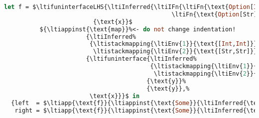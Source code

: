 {\begin{lstlisting}[language=ml,mathescape=true]
let f = $\ltifuninterfaceLHS{\ltiInferred{\ltiIFn{\ltiFn{\text{Option[Int]}}{\text{Option[Int]}}%
                                               \ltiFn{\text{Option[Str]}}{\text{Option[Str]}}}}}%
                         {\text{x}}$
          ${\ltiappinst{\text{map}}%<- do not change indentation!
                       {\ltiInferred%
                        {\ltistackmapping{\ltiEnv{1}}{\text{[Int,Int]}},%
                         \ltistackmapping{\ltiEnv{2}}{\text{[Str,Str]}}}}%
                       {\ltifuninterface{\ltiInferred%
                                         {\ltistackmapping{\ltiEnv{1}}{\ltiFn{\text{Int}}{\text{Int}}},%
                                          \ltistackmapping{\ltiEnv{2}}{\ltiFn{\text{Str}}{\text{Str}}}}}%
                                        {\text{y}}%
                                        {\text{y}},%
                        \text{x}}}$ in
  {left  = $\ltiapp{\text{f}}{\ltiappinst{\text{Some}}{\ltiInferred{\text{Int}}}{\text{1}}}$,
   right = $\ltiapp{\text{f}}{\ltiappinst{\text{Some}}{\ltiInferred{\text{Str}}}{\text{"a"}}}$}
\end{lstlisting}
}
